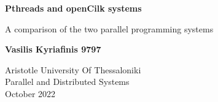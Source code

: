 \begin{titlepage}
    \begin{center}
        \vspace*{4cm}
 
        \textbf{\Large{Pthreads and openCilk systems}}
 
        \vspace{0.5cm}
        \large{A comparison of the two parallel programming systems}
             
        \vspace{1cm}
 
        \textbf{Vasilis Kyriafinis 9797}
 
        \vfill
                                
        Aristotle University Of Thessaloniki\\
        Parallel and Distributed Systems\\
        October 2022
        \vspace*{0cm}
             
    \end{center}
\end{titlepage}